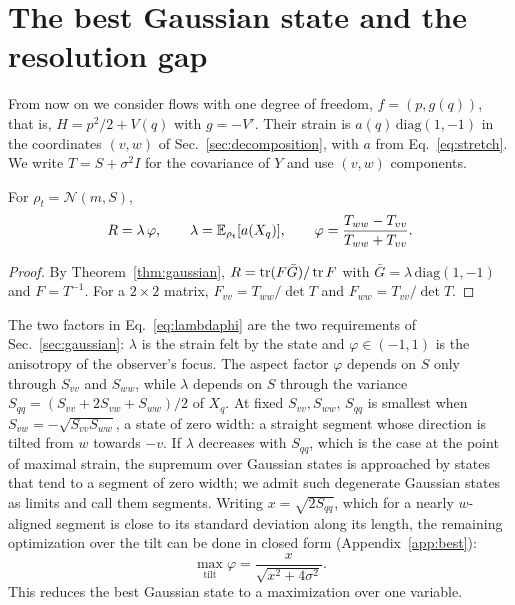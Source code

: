 \section{The best Gaussian state and the resolution gap}
\label{sec:best}

From now on we consider flows with one degree of freedom, $f = (p, g(q))$, that is, $H = p^2/2 + V(q)$ with $g = -V'$. Their strain is $a(q)\,\mathrm{diag}(1,-1)$ in the coordinates $(v,w)$ of Sec.~\ref{sec:decomposition}, with $a$ from Eq.~\eqref{eq:stretch}. We write $T = S + \sigma^2 I$ for the covariance of $Y$ and use $(v,w)$ components.

\begin{lemma}
\label{lem:lambdaphi}
For $\rho_t = \mathcal N(m,S)$,
\begin{equation}
R = \lambda\,\varphi, \qquad \lambda = \mathbb{E}_{\rho_t}[a(X_q)], \qquad \varphi = \frac{T_{ww} - T_{vv}}{T_{ww} + T_{vv}} .
\label{eq:lambdaphi}
\end{equation}
\end{lemma}

\begin{proof}
By Theorem~\ref{thm:gaussian}, $R = \operatorname{tr}(F\bar G)/\operatorname{tr} F$ with $\bar G = \lambda\,\mathrm{diag}(1,-1)$ and $F = T^{-1}$. For a $2\times2$ matrix, $F_{vv} = T_{ww}/\det T$ and $F_{ww} = T_{vv}/\det T$.
\end{proof}

The two factors in Eq.~\eqref{eq:lambdaphi} are the two requirements of Sec.~\ref{sec:gaussian}: $\lambda$ is the strain felt by the state and $\varphi \in (-1,1)$ is the anisotropy of the observer's focus. The aspect factor $\varphi$ depends on $S$ only through $S_{vv}$ and $S_{ww}$, while $\lambda$ depends on $S$ through the variance $S_{qq} = (S_{vv} + 2S_{vw} + S_{ww})/2$ of $X_q$. At fixed $S_{vv}, S_{ww}$, $S_{qq}$ is smallest when $S_{vw} = -\sqrt{S_{vv}S_{ww}}$, a state of zero width: a straight segment whose direction is tilted from $w$ towards $-v$. If $\lambda$ decreases with $S_{qq}$, which is the case at the point of maximal strain, the supremum over Gaussian states is approached by states that tend to a segment of zero width; we admit such degenerate Gaussian states as limits and call them segments. Writing $x = \sqrt{2S_{qq}}$, which for a nearly $w$-aligned segment is close to its standard deviation along its length, the remaining optimization over the tilt can be done in closed form (Appendix~\ref{app:best}):
\begin{equation}
\max_{\text{tilt}}\varphi = \frac{x}{\sqrt{x^2 + 4\sigma^2}} .
\label{eq:phimax}
\end{equation}
This reduces the best Gaussian state to a maximization over one variable.

